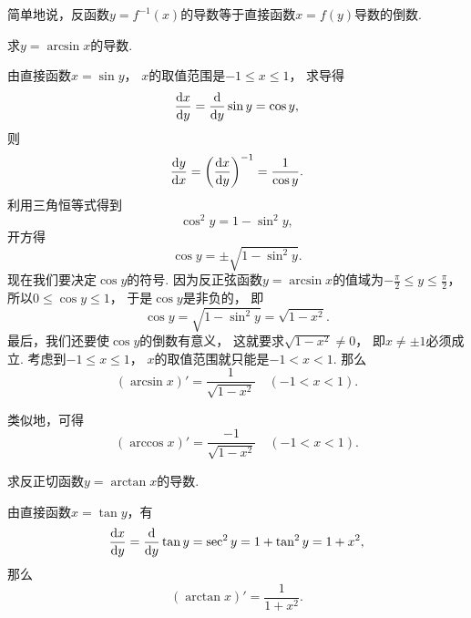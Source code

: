 简单地说，反函数\(y=f^{-1}(x)\)的导数等于直接函数\(x=f(y)\)导数的倒数.

\begin{example}
求\(y=\arcsin x\)的导数.
\begin{solution}
由直接函数\(x=\sin y\)，
\(x\)的取值范围是\(-1 \leq x \leq 1\)，
求导得\begin{equation*}
	\dv{x}{y}
	= \dv{y} \sin y
	= \cos y,
\end{equation*}
则\begin{equation*}
	\dv{y}{x}
	= \left(\dv{x}{y}\right)^{-1}
	= \frac1{\cos y}.
\end{equation*}
利用三角恒等式得到\begin{equation*}
	\cos^2 y = 1 - \sin^2 y,
\end{equation*}
开方得\begin{equation*}
	\cos y = \pm\sqrt{1 - \sin^2 y}.
\end{equation*}
现在我们要决定\(\cos y\)的符号.
因为反正弦函数\(y = \arcsin x\)的值域为\(-\frac\pi2 \leq y \leq \frac\pi2\)，
所以\(0 \leq \cos y \leq 1\)，
于是\(\cos y\)是非负的，
即\begin{equation*}
	\cos y
	= \sqrt{1 - \sin^2 y}
	= \sqrt{1 - x^2}.
\end{equation*}
最后，我们还要使\(\cos y\)的倒数有意义，
这就要求\(\sqrt{1-x^2}\neq0\)，
即\(x\neq\pm1\)必须成立.
考虑到\(-1 \leq x \leq 1\)，
\(x\)的取值范围就只能是\(-1 < x < 1\).
那么\begin{equation*}
	(\arcsin x)' = \frac1{\sqrt{1 - x^2}}
	\quad(-1<x<1).
\end{equation*}
\end{solution}
\end{example}

类似地，可得\begin{equation*}
	(\arccos x)' = \frac{-1}{\sqrt{1 - x^2}}
	\quad(-1<x<1).
\end{equation*}

\begin{example}
求反正切函数\(y=\arctan x\)的导数.
\begin{solution}
由直接函数\(x=\tan y\)，有\begin{equation*}
	\dv{x}{y}
	= \dv{y} \tan y
	= \sec^2 y
	= 1 + \tan^2 y
	= 1 + x^2,
\end{equation*}
那么\begin{equation*}
	(\arctan x)' = \frac1{1+x^2}.
\end{equation*}
\end{solution}
\end{example}

